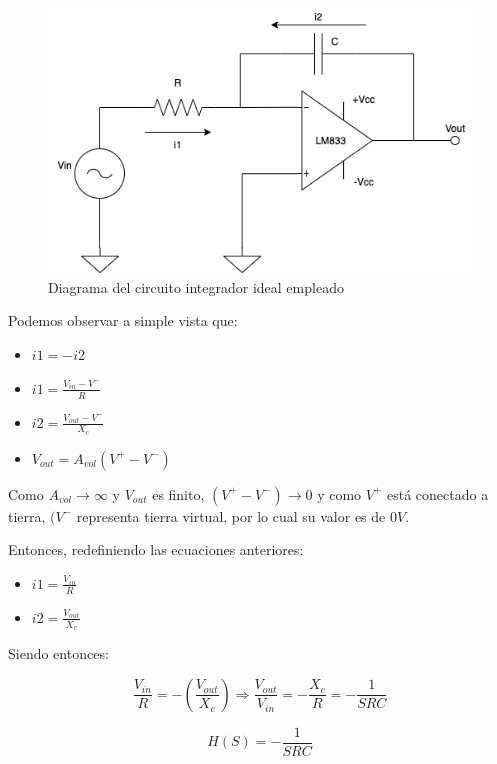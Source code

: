 \begin{figure}[H]
    \centering 
    \includegraphics [scale=0.5] {../Ejercicio3-CircuitoIntegradoresyDerivadores/Imagenes/diagrama-integrador-corrientes.png} 
    \caption{Diagrama del circuito integrador ideal empleado}
    \label{fig:emptyPlotTool}
\end{figure}

Podemos observar a simple vista que:

\begin{itemize}
	\item $i1 = -i2$
	\item $i1 = \frac {V_{in}-V^{-}}{R} $
	\item $i2 = \frac {V_{out}-V^{-}}{X_c}$
	\item $V_{out} = A_{vol}(V^{+}-V^{-})$
\end{itemize}

Como ${A_{vol} \to \infty}$ y $V_{out}$ es finito, ${(V^{+}-V^{-}) \to 0}$ y como $V^{+}$ está conectado a tierra,
$(V^{-}$ representa tierra virtual, por lo cual su valor es de $0V$.

Entonces, redefiniendo las ecuaciones anteriores:

\begin{itemize}
	\item $i1 = \frac{V_{in}}{R} $
	\item $i2 = \frac {V_{out}}{X_c}$
\end{itemize}

Siendo entonces:

$$ \frac{V_{in}}{R} = - (\frac{V_{out}}{X_c}) \Longrightarrow \frac{V_{out}}{V_{in}} = -\frac{X_c}{R} = - \frac{1}{SRC}$$

$$ H(S) = - \frac{1}{SRC}$$

